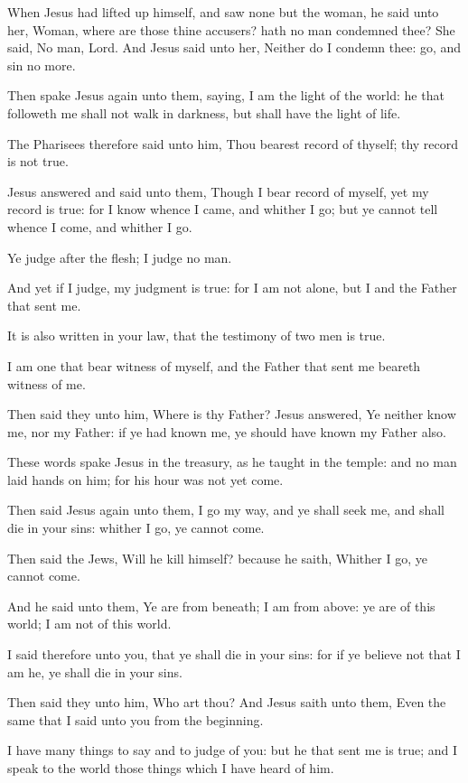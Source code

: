 \verse When Jesus had lifted up himself, and saw none but the woman, he said unto her, Woman, where are those thine accusers? hath no man condemned thee?  \verse She said, No man, Lord. And Jesus said unto her, Neither do I condemn thee: go, and sin no more.

\verse Then spake Jesus again unto them, saying, I am the light of the world: he that followeth me shall not walk in darkness, but shall have the light of life.

\verse The Pharisees therefore said unto him, Thou bearest record of thyself; thy record is not true.

\verse Jesus answered and said unto them, Though I bear record of myself, yet my record is true: for I know whence I came, and whither I go; but ye cannot tell whence I come, and whither I go.

\verse Ye judge after the flesh; I judge no man.

\verse And yet if I judge, my judgment is true: for I am not alone, but I and the Father that sent me.

\verse It is also written in your law, that the testimony of two men is true.

\verse I am one that bear witness of myself, and the Father that sent me beareth witness of me.

\verse Then said they unto him, Where is thy Father? Jesus answered, Ye neither know me, nor my Father: if ye had known me, ye should have known my Father also.

\verse These words spake Jesus in the treasury, as he taught in the temple: and no man laid hands on him; for his hour was not yet come.

\verse Then said Jesus again unto them, I go my way, and ye shall seek me, and shall die in your sins: whither I go, ye cannot come.

\verse Then said the Jews, Will he kill himself? because he saith, Whither I go, ye cannot come.

\verse And he said unto them, Ye are from beneath; I am from above: ye are of this world; I am not of this world.

\verse I said therefore unto you, that ye shall die in your sins: for if ye believe not that I am he, ye shall die in your sins.

\verse Then said they unto him, Who art thou? And Jesus saith unto them, Even the same that I said unto you from the beginning.

\verse I have many things to say and to judge of you: but he that sent me is true; and I speak to the world those things which I have heard of him.

